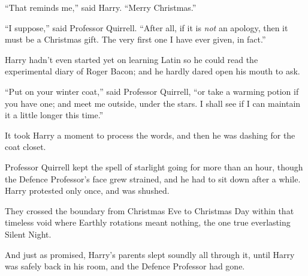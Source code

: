 “That reminds me,” said Harry. “Merry Christmas.”

“I suppose,” said Professor Quirrell. “After all, if it is \emph{not} an apology, then it must be a Christmas gift. The very first one I have ever given, in fact.”

Harry hadn’t even started yet on learning Latin so he could read the experimental diary of Roger Bacon; and he hardly dared open his mouth to ask.

“Put on your winter coat,” said Professor Quirrell, “or take a warming potion if you have one; and meet me outside, under the stars. I shall see if I can maintain it a little longer this time.”

It took Harry a moment to process the words, and then he was dashing for the coat closet.

Professor Quirrell kept the spell of starlight going for more than an hour, though the Defence Professor’s face grew strained, and he had to sit down after a while. Harry protested only once, and was shushed.

They crossed the boundary from Christmas Eve to Christmas Day within that timeless void where Earthly rotations meant nothing, the one true everlasting Silent Night.

And just as promised, Harry’s parents slept soundly all through it, until Harry was safely back in his room, and the Defence Professor had gone.
